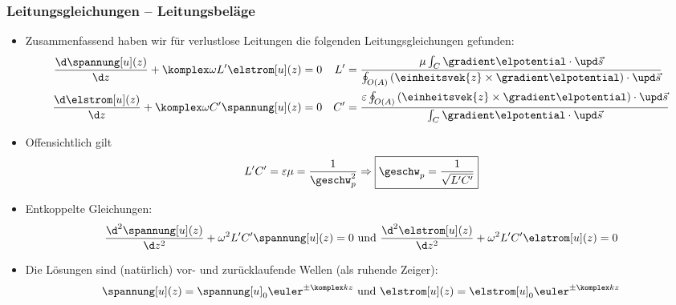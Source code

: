 \begin{frame}
  \frametitle{Leitungsgleichungen -- Leitungsbeläge}
  \begin{itemize}[<+->]
  \item Zusammenfassend haben wir für verlustlose Leitungen die folgenden \alert{Leitungsgleichungen} gefunden:
    \begin{align*}
      \frac{\d \spannung[u](z)}{\d z} + \komplex\omega L^\prime \elstrom[u](z) &= 0 & L^\prime &=\frac{\mu\int_C\gradient\elpotential \cdot \upd \vec{s}}{\oint_{O(A)} \left(\einheitsvek{z}\times\gradient\elpotential\right) \cdot \upd\vec{s}}\\
      \frac{\d \elstrom[u](z)}{\d z} +\komplex\omega C^\prime \spannung[u](z) & = 0 & C^\prime &= \frac{\varepsilon\oint_{O(A)}\left(\einheitsvek{z}\times \gradient\elpotential\right) \cdot \upd \vec{s}}{\int_C \gradient\elpotential\cdot\upd\vec{s}}
    \end{align*}
  \item Offensichtlich gilt
    \begin{equation*}
      L^\prime C^\prime = \varepsilon\mu = \frac{1}{\geschw_p^2} \Rightarrow \boxed{\geschw_p = \frac{1}{\sqrt{L^\prime C^\prime}}}
    \end{equation*}
  \item Entkoppelte Gleichungen:
    \begin{equation*}
      \frac{\d^2 \spannung[u](z)}{\d z^2} + \omega^2 L^\prime C^\prime \spannung[u](z) = 0 \text{ und } \frac{\d^2 \elstrom[u](z)}{\d z^2} + \omega^2 L^\prime C^\prime \elstrom[u](z) = 0
    \end{equation*}
  \item Die Lösungen sind (natürlich) vor- und zurücklaufende Wellen (als ruhende Zeiger):
    \begin{equation*}
      \spannung[u](z) = \spannung[u]_0 \euler^{\pm\komplex kz} \text{ und } \elstrom[u](z) = \elstrom[u]_0 \euler^{\pm\komplex kz}
      \end{equation*}
  \end{itemize}
\end{frame}

